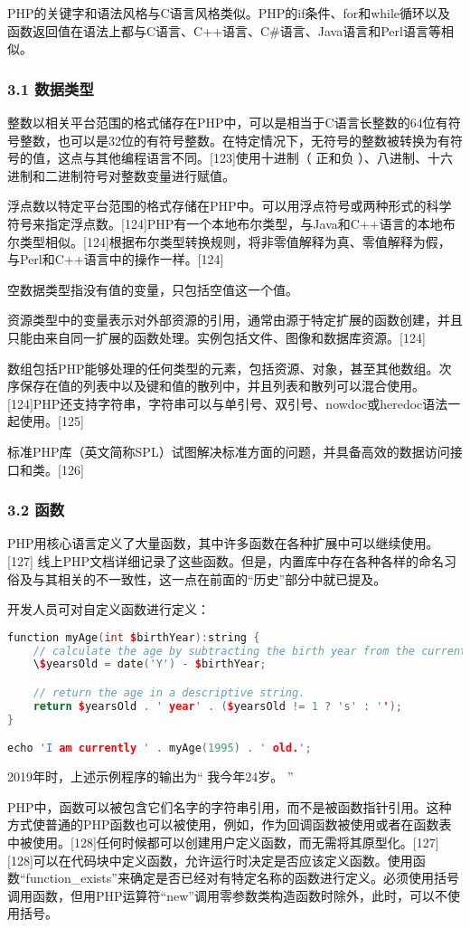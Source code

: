 PHP的关键字和语法风格与C语言风格类似。PHP的if条件、for和while循环以及函数返回值在语法上都与C语言、C++语言、C#语言、Java语言和Perl语言等相似。
\subsubsection{3.1 数据类型}
整数以相关平台范围的格式储存在PHP中，可以是相当于C语言长整数的64位有符号整数，也可以是32位的有符号整数。在特定情况下，无符号的整数被转换为有符号的值，这点与其他编程语言不同。[123]使用十进制（ 正和负 ）、八进制、十六进制和二进制符号对整数变量进行赋值。

浮点数以特定平台范围的格式存储在PHP中。可以用浮点符号或两种形式的科学符号来指定浮点数。[124]PHP有一个本地布尔类型，与Java和C++语言的本地布尔类型相似。[124]根据布尔类型转换规则，将非零值解释为真、零值解释为假，与Perl和C++语言中的操作一样。[124]

空数据类型指没有值的变量，只包括空值这一个值。

资源类型中的变量表示对外部资源的引用，通常由源于特定扩展的函数创建，并且只能由来自同一扩展的函数处理。实例包括文件、图像和数据库资源。[124]

数组包括PHP能够处理的任何类型的元素，包括资源、对象，甚至其他数组。次序保存在值的列表中以及键和值的散列中，并且列表和散列可以混合使用。[124]PHP还支持字符串，字符串可以与单引号、双引号、nowdoc或heredoc语法一起使用。[125]

标准PHP库（英文简称SPL）试图解决标准方面的问题，并具备高效的数据访问接口和类。[126]
\subsubsection{3.2 函数}
PHP用核心语言定义了大量函数，其中许多函数在各种扩展中可以继续使用。[127] 线上PHP文档详细记录了这些函数。但是，内置库中存在各种各样的命名习俗及与其相关的不一致性，这一点在前面的“历史”部分中就已提及。

开发人员可对自定义函数进行定义：
\begin{lstlisting}[language=cpp]
function myAge(int $birthYear):string {
    // calculate the age by subtracting the birth year from the current year.
    \$yearsOld = date('Y') - $birthYear;

    // return the age in a descriptive string.
    return $yearsOld . ' year' . ($yearsOld != 1 ? 's' : '');
}

echo 'I am currently ' . myAge(1995) . ' old.';
\end{lstlisting}
2019年时，上述示例程序的输出为“ 我今年24岁。 ”

PHP中，函数可以被包含它们名字的字符串引用，而不是被函数指针引用。这种方式使普通的PHP函数也可以被使用，例如，作为回调函数被使用或者在函数表中被使用。[128]任何时候都可以创建用户定义函数，而无需将其原型化。[127][128]可以在代码块中定义函数，允许运行时决定是否应该定义函数。使用函数“function_exists”来确定是否已经对有特定名称的函数进行定义。必须使用括号调用函数，但用PHP运算符“new”调用零参数类构造函数时除外，此时，可以不使用括号。

